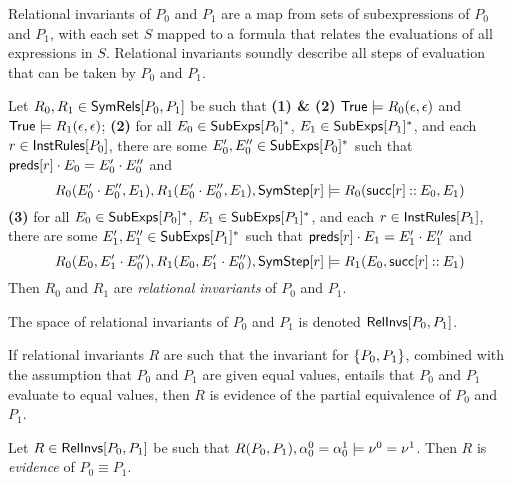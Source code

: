 Relational invariants of $P_0$ and $P_1$ are a map from sets of
subexpressions of $P_0$ and $P_1$, with each set $S$ mapped to a
formula that relates the evaluations of all expressions in $S$.
%
Relational invariants soundly describe all steps of evaluation that
can be taken by $P_0$ and $P_1$.
%
\begin{defn}
  \label{defn:rel-invs}
  Let $R_0, R_1 \in \mathsf{SymRels}[ P_0, P_1 ]$ be such that %
  \textbf{(1) \& (2)} $\mathsf{True} \models R_0(\epsilon, \epsilon)$ and
  $\mathsf{True} \models R_1(\epsilon, \epsilon)$;
  \textbf{(2)} for all $E_0 \in \mathsf{SubExps}[ P_0 ]^{*}$, %
  $E_1 \in \mathsf{SubExps}[ P_1 ]^{*}$, and %
  each $r \in \mathsf{InstRules}[ P_0 ]$, %
  there are some $E_0', E_0'' \in \mathsf{SubExps}[ P_0 ]^{*}$ such that
  $\mathsf{preds}[  r  ] \cdot E_0 = E_0' \cdot E_0''$ and
  \[ R_0(E_0' \concat E_0'', E_1), %
  R_1(E_0' \concat E_0'', E_1), %
  \symstep{ r } \entails R_0(\rulesucc{r} \cons E_0, E_1) \]
  \textbf{(3)} for all $E_0 \in \mathsf{SubExps}[ P_0 ]^{*}$, %
  $E_1 \in \mathsf{SubExps}[ P_1 ]^{*}$, and %
  each $r \in \mathsf{InstRules}[ P_1 ]$, %
  there are some $E_1', E_1'' \in \mathsf{SubExps}[ P_1 ]^{*}$ such that
  $\mathsf{preds}[  r  ] \cdot E_1 = E_1' \cdot E_1''$ and
  \[ R_0(E_0, E_1' \concat E_0''), %
  R_1(E_0, E_1' \concat E_0''), %
  \symstep{ r } \entails R_1(E_0, \rulesucc{r} \cons E_1) \]
  Then $R_0$ and $R_1$ are \emph{relational invariants} of $P_0$ and
  $P_1$.
\end{defn}
%
The space of relational invariants of $P_0$ and $P_1$ is denoted
$\mathsf{RelInvs}[ P_0, P_1 ]$.

If relational invariants $R$ are such that the invariant for $\{ 
  P_0, P_1  \}$, combined with the assumption that $P_0$ and $P_1$ are
given equal values, entails that $P_0$ and $P_1$ evaluate to equal
values, then $R$ is evidence of the partial equivalence of $P_0$ and
$P_1$.
%
\begin{defn}
  \label{defn:eq-pf}
  Let $R \in \mathsf{RelInvs}[ P_0, P_1 ]$ be such that $R(P_0, P_1), \alpha^0_0
  = \alpha^1_0 \models \nu^0 = \nu^1$.
  Then $R$ is \emph{evidence} of $P_0 \equiv P_1$.
\end{defn}

\begin{ex}
  \label{ex:rel-invs}
\end{ex}

